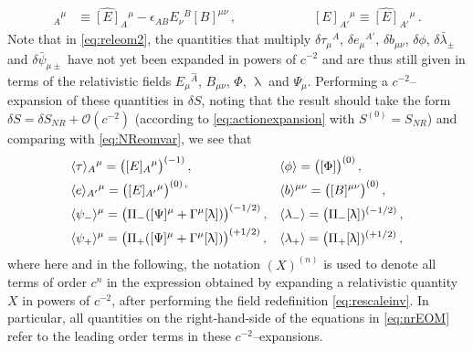 \documentclass[a4paper,10pt,openany]{article}
\begin{document}
	\begin{align}
		[E]_A{}^\mu &\equiv \widehat{[E]}_A{}^\mu - \epsilon_{AB} E_\nu{}^B [B]^{\mu\nu} \,, \qquad \qquad \qquad
		[E]_{A'}{}^\mu \equiv \widehat{[E]}_{A'}{}^\mu \,.
	\end{align}
	Note that in \eqref{eq:releom2}, the quantities that multiply $\delta \tau_\mu{}^A$, $\delta e_\mu{}^{A'}$, $\delta b_{\mu\nu}$, $\delta \phi$, $\delta \bar{\lambda}_\pm$ and $\delta \bar{\psi}_{\mu \pm}$ have not yet been expanded in powers of $c^{-2}$ and are thus still given in terms of the relativistic fields $E_\mu{}^{\hat{A}}$, $B_{\mu\nu}$, $\Phi$, $\uplambda$ and $\Psi_\mu$. Performing a $c^{-2}$--expansion of these quantities in $\delta S$, noting that the result should take the form $\delta S = \delta S_{NR} + \mathcal{O}(c^{-2})$ (according to \eqref{eq:actionexpansion} with $S^{(0)} = S_{NR}$) and comparing with \eqref{eq:NReomvar}, we see that
	\begin{align}\label{eq:nrEOM}
		&\langle \tau\rangle_A{}^\mu=\big([E]_A{}^\mu\big)^{(-1)} \,, && \langle \phi\rangle=\big([\Phi]\big)^{(0)}\,, \notag\\
		& \langle e\rangle_{A'}{}^\mu=\big([E]_{A'}{}^\mu\big)^{(0) \,, }&& \langle b\rangle^{\mu\nu}=\big([B]^{\mu\nu}\big)^{(0)}\,,\notag\\
		&\langle \psi_-\rangle^\mu=\big(\Pi_-([\Psi]^\mu+\Gamma^\mu[\uplambda])\big)^{(-1/2)}\,,&& \langle \lambda_-\rangle=\big(\Pi_-[\uplambda])^{(-1/2)}\,,\notag\\
		&\langle \psi_+\rangle^\mu=\big(\Pi_+([\Psi]^\mu+\Gamma^\mu[\uplambda])\big)^{(+1/2)}\,,&& \langle \lambda_+\rangle=\big(\Pi_+[\uplambda])^{(+1/2)}\,,
	\end{align}
	where here and in the following, the notation $(X)^{(n)}$ is used to denote all terms of order $c^n$ in the expression obtained by expanding a relativistic quantity $X$ in powers of $c^{-2}$, after performing the field redefinition \eqref{eq:rescaleinv}. In particular, all quantities on the right-hand-side of the equations in \eqref{eq:nrEOM} refer to the leading order terms in these $c^{-2}$--expansions.
	
\end{document}
